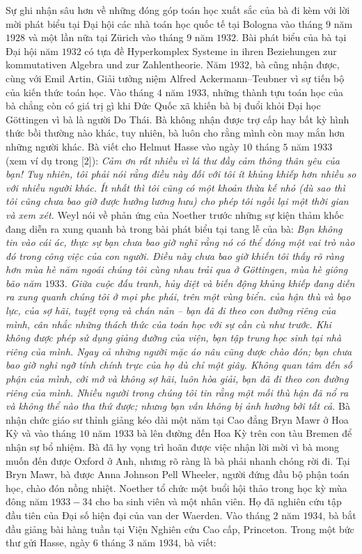 \begin{multicols}{2}
	\vskip 0.05cm
	Sự ghi nhận sâu hơn về những đóng góp toán học xuất sắc của bà đi kèm với lời mời phát biểu tại Đại hội các nhà toán học quốc tế tại Bologna vào tháng $9$ năm $1928$ và một lần nữa tại Zürich vào tháng $9$ năm $1932$. Bài phát biểu của bà tại Đại hội năm $1932$ có tựa đề Hyperkomplex Systeme in ihren Beziehungen zur kommutativen Algebra und zur Zahlentheorie. Năm $1932$, bà cũng nhận được, cùng với Emil Artin, Giải tưởng niệm Alfred Ackermann--Teubner vì sự tiến bộ của kiến thức toán học. Vào tháng $4$ năm $1933$, những thành tựu toán học của bà chẳng còn có giá trị gì khi Đức Quốc xã khiến bà bị đuổi khỏi Đại học Göttingen vì bà là người Do Thái. Bà không nhận được trợ cấp hay bất kỳ hình thức bồi thường nào khác, tuy nhiên, bà luôn cho rằng mình còn may mắn hơn những người khác. Bà viết cho Helmut Hasse vào ngày $10$ tháng $5$ năm $1933$ (xem ví dụ trong [$2$]):
	\vskip 0.05cm
	\textit{Cảm ơn rất nhiều vì lá thư đầy cảm thông thân yêu của bạn! Tuy nhiên, tôi phải nói rằng điều này đối với tôi ít khủng khiếp hơn nhiều so với nhiều người khác. Ít nhất thì tôi cũng có một khoản thừa kế nhỏ (dù sao thì tôi cũng chưa bao giờ được hưởng lương hưu) cho phép tôi ngồi lại một thời gian và xem xét.}
	\vskip 0.05cm
	Weyl nói về phản ứng của Noether trước những sự kiện thảm khốc đang diễn ra xung quanh bà trong bài phát biểu tại tang lễ của bà:
	\vskip 0.05cm
	\textit{Bạn không tin vào cái ác, thực sự bạn chưa bao giờ nghĩ rằng nó có thể đóng một vai trò nào đó trong công việc của con người. Điều này chưa bao giờ khiến tôi thấy rõ ràng hơn mùa hè năm ngoái chúng tôi cùng nhau trải qua ở Göttingen, mùa hè giông bão năm $1933$. Giữa cuộc đấu tranh, hủy diệt và biến động khủng khiếp đang diễn ra xung quanh chúng tôi ở mọi phe phái, trên một vùng biển. của hận thù và bạo lực, của sợ hãi, tuyệt vọng và chán nản -- bạn đã đi theo con đường riêng của mình, cân nhắc những thách thức của toán học với sự cần cù như trước. Khi không được phép sử dụng giảng đường của viện, bạn tập trung học sinh tại nhà riêng của mình. Ngay cả những người mặc áo nâu cũng được chào đón; bạn chưa bao giờ nghi ngờ tính chính trực của họ dù chỉ một giây. Không quan tâm đến số phận của mình, cởi mở và không sợ hãi, luôn hòa giải, bạn đã đi theo con đường riêng của mình. Nhiều người trong chúng tôi tin rằng một mối thù hận đã nổ ra và không thể nào tha thứ được; nhưng bạn vẫn không bị ảnh hưởng bởi tất cả.}
	\vskip 0.05cm
	Bà nhận chức giáo sư thỉnh giảng kéo dài một năm tại Cao đẳng Bryn Mawr ở Hoa Kỳ và vào tháng $10$ năm $1933$ bà lên đường đến Hoa Kỳ trên con tàu Bremen để nhận sự bổ nhiệm. Bà đã hy vọng trì hoãn được việc nhận lời mời vì bà mong muốn đến được Oxford ở Anh, nhưng rõ ràng là bà phải nhanh chóng rời đi. Tại Bryn Mawr, bà được Anna Johnson Pell Wheeler, người đứng đầu bộ phận toán học, chào đón nồng nhiệt. Noether tổ chức một buổi hội thảo trong học kỳ mùa đông năm $1933-34$ cho ba sinh viên và một nhân viên. Họ đã nghiên cứu tập đầu tiên của Đại số hiện đại của van der Waerden. Vào tháng $2$ năm $1934$, bà bắt đầu giảng bài hàng tuần tại Viện Nghiên cứu Cao cấp, Princeton. Trong một bức thư gửi Hasse, ngày $6$ tháng $3$ năm $1934$, bà viết: 

\end{multicols}
